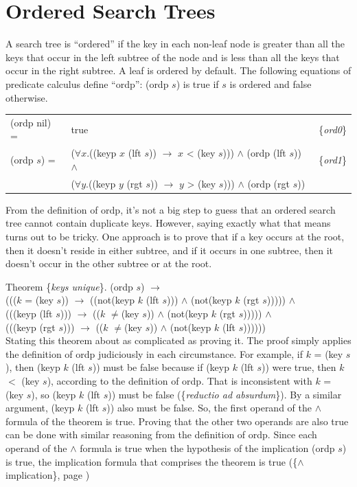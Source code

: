 \section{Ordered Search Trees}

A search tree is ``ordered'' if the key in each non-leaf node is
greater than all the keys that occur in the left subtree of the node
and is less than all the keys that occur in the right subtree. A
leaf is ordered by default.
The following equations of predicate calculus define
``ordp'':
(ordp $s$) is true if $s$ is ordered and false otherwise.

\begin{center}
\begin{tabular}{lll}
(ordp nil) = & true & \{\emph{ord0}\} \\
(ordp $s$) = & ($\forall x$.((keyp $x$ (lft $s$)) $\rightarrow$ $x$ < (key $s$))) $\wedge$ (ordp (lft $s$)) $\wedge$ & \{\emph{ord1}\} \\
             & ($\forall y$.((keyp $y$ (rgt $s$)) $\rightarrow$ $y$ > (key $s$))) $\wedge$ (ordp (rgt $s$))          & \\
\end{tabular}
\end{center}

From the definition of ordp, it's not a big step to
guess that an ordered search tree cannot contain duplicate keys.
However, saying exactly what that means turns out to be tricky.
One approach is to prove that if a key occurs at the root,
then it doesn't reside in either subtree, and if it occurs
in one subtree, then it doesn't occur in the other subtree or at the root.

Theorem \{\emph{keys unique}\}. (ordp $s$) $\rightarrow$ \\
((($k$ = (key $s$)) $\rightarrow$ ((not(keyp $k$ (lft $s$))) $\wedge$ (not(keyp $k$ (rgt $s$))))) $\wedge$ \\
(((keyp (lft $s$))) $\rightarrow$ (($k$ $\ne$(key $s$)) $\wedge$ (not(keyp $k$ (rgt $s$))))) $\wedge$ \\
(((keyp (rgt $s$))) $\rightarrow$ (($k$ $\ne$(key $s$)) $\wedge$ (not(keyp $k$ (lft $s$)))))) \\

Stating this theorem about as complicated as proving it.
The proof simply applies the definition of ordp judiciously in each circumstance.
For example, if $k$ = (key $s$), then (keyp $k$ (lft $s$)) must be false
because if (keyp $k$ (lft $s$)) were true, then $k$ $<$ (key $s$),
according to the definition of ordp. That is inconsistent with  $k$ = (key $s$),
so (keyp $k$ (lft $s$)) must be false (\{\emph{reductio ad absurdum}\}).
By a similar argument, (keyp $k$ (lft $s$)) also must be false.
So, the first operand of the $\wedge$ formula of the theorem is true.
Proving that the other two operands are also true can be done
with similar reasoning from the definition of ordp.
Since each operand of the $\wedge$ formula is true when the hypothesis
of the implication (ordp $s$) is true,
the implication formula that comprises the theorem is true
(\{$\wedge$ implication\}, page \pageref{and-implication})


